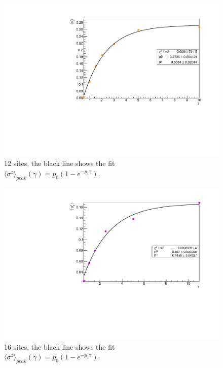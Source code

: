 \begin{figure}[H]
    \centering
    \includegraphics[scale=0.7]{Figures/12sites/FIT_12sites_3rdLMvsGamma.pdf}
    \caption{12 sites, the black line shows the fit \\$\langle\sigma^z\rangle_{peak}(\gamma) = p_0(1-e^{-p_1\gamma})$.}
    \label{fig:FIT12sites_3rdSiteVSgamma}
\end{figure}

\begin{figure}[H]
    \centering
    \includegraphics[scale=0.7]{Figures/16sites/FIT_16sites_4thSiteVSgamma.pdf}
    \caption{16 sites, the black line shows the fit \\$\langle\sigma^z\rangle_{peak}(\gamma) = p_0(1-e^{-p_1\gamma})$.}
    \label{fig:FIT_16sites_4thSiteVSgamma}
\end{figure}

